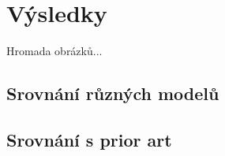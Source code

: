 \chapter{Výsledky}

Hromada obrázků...

\section{Srovnání různých modelů}

\section{Srovnání s prior art}
